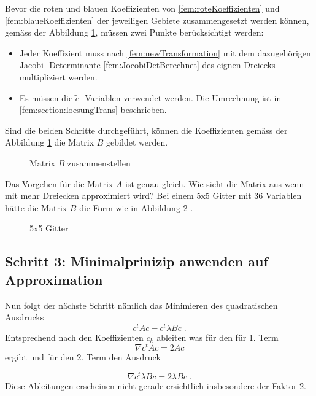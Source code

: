 Bevor die roten und blauen Koeffizienten von \eqref{fem:roteKoeffizienten} und \eqref{fem:blaueKoeffizienten} der jeweiligen Gebiete zusammengesetzt werden können, gemäss der Abbildung \ref{fem:MatrixBKomplett}, müssen zwei Punkte berücksichtigt werden:
\begin{itemize}
	\item Jeder Koeffizient muss nach \eqref{fem:newTransformation} mit dem dazugehörigen Jacobi- Determinante \eqref{fem:JocobiDetBerechnet} des eignen Dreiecks multipliziert werden. 
	\item Es müssen die $\tilde{c}$- Variablen verwendet werden. Die Umrechnung ist in  \ref{fem:section:loesungTrans} beschrieben.
\end{itemize}
Sind die beiden Schritte durchgeführt, können die Koeffizienten gemäss der Abbildung \ref{fem:MatrixBKomplett} die Matrix $B$ gebildet werden.
\begin{figure}[h]
	\centering
	
	\caption{Matrix $B$ zusammenstellen }
	\label{fem:MatrixBKomplett}
\end{figure}
Das Vorgehen für die Matrix $A$ ist genau gleich. Wie sieht die Matrix aus wenn mit mehr Dreiecken approximiert wird? Bei einem 5x5 Gitter mit 36 Variablen hätte die Matrix $B$ die Form wie in Abbildung \ref{fem:MatrixBGross} .

\begin{figure}[h]
	\centering
	
	\caption{5x5 Gitter}
	\label{fem:MatrixBGross}
\end{figure}


\subsection{Schritt 3: Minimalprinizip anwenden auf Approximation}

Nun folgt der nächste Schritt nämlich das Minimieren des quadratischen Ausdrucks
\begin{equation}
	c^t Ac - c^t \lambda Bc \; .
\end{equation}
Entsprechend nach den Koeffizienten $c_k$ ableiten was für den  für 1. Term
\begin{equation}
	\nabla c^t Ac = 2Ac
\end{equation}
ergibt und für den 2. Term den Ausdruck

\begin{equation}
	\nabla c^t \lambda Bc = 2\lambda Bc \; .
\end{equation}
Diese Ableitungen erscheinen nicht gerade ersichtlich insbesondere der Faktor 2. \\

